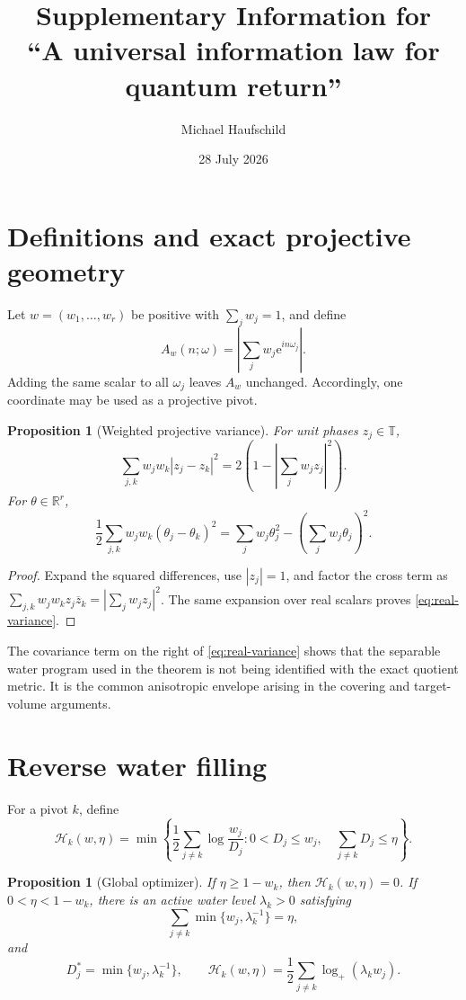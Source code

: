 \documentclass[10pt]{article}
\title{\textbf{Supplementary Information for\\
``A universal information law for quantum return''}}
\author{Michael Haufschild}
\date{28 July 2026}
\newtheorem{proposition}[theorem]{Proposition}
\theoremstyle{definition}
\newcommand{\R}{\mathbb R}
\newcommand{\T}{\mathbb T}
\newcommand{\Hwater}{\mathcal H}
\newcommand{\ee}{\mathrm e}
\begin{document}
\maketitle

\section{Definitions and exact projective geometry}

Let \(w=(w_1,\ldots,w_r)\) be positive with \(\sum_jw_j=1\), and define
\[
 A_w(n;\omega)=\left|\sum_jw_j\ee^{in\omega_j}\right|.
\]
Adding the same scalar to all \(\omega_j\) leaves \(A_w\) unchanged.
Accordingly, one coordinate may be used as a projective pivot.

\begin{proposition}[Weighted projective variance]
\label{prop:variance}
For unit phases \(z_j\in\T\),
\begin{equation}
 \sum_{j,k}w_jw_k|z_j-z_k|^2
 =2\left(1-\left|\sum_jw_jz_j\right|^2\right).
\label{eq:variance}
\end{equation}
For \(\theta\in\R^r\),
\begin{equation}
 \frac12\sum_{j,k}w_jw_k(\theta_j-\theta_k)^2
 =\sum_jw_j\theta_j^2-\left(\sum_jw_j\theta_j\right)^2.
\label{eq:real-variance}
\end{equation}
\end{proposition}

\begin{proof}
Expand the squared differences, use \(|z_j|=1\), and factor the cross
term as
\(\sum_{j,k}w_jw_kz_j\overline z_k=|\sum_jw_jz_j|^2\).
The same expansion over real scalars proves \eqref{eq:real-variance}.
\end{proof}

The covariance term on the right of \eqref{eq:real-variance} shows that the
separable water program used in the theorem is not being identified with the
exact quotient metric.  It is the common anisotropic envelope arising in the
covering and target-volume arguments.

\section{Reverse water filling}

For a pivot \(k\), define
\[
 \Hwater_k(w,\eta)
 =\min\left\{\frac12\sum_{j\ne k}\log\frac{w_j}{D_j}:
   0<D_j\leq w_j,\quad\sum_{j\ne k}D_j\leq\eta\right\}.
\]

\begin{proposition}[Global optimizer]
\label{prop:optimizer}
If \(\eta\geq1-w_k\), then \(\Hwater_k(w,\eta)=0\).  If
\(0<\eta<1-w_k\), there is an active water level
\(\lambda_k>0\) satisfying
\[
 \sum_{j\ne k}\min\{w_j,\lambda_k^{-1}\}=\eta,
\]
and
\[
 D_j^*=\min\{w_j,\lambda_k^{-1}\},\qquad
 \Hwater_k(w,\eta)=\frac12\sum_{j\ne k}\log_+(\lambda_kw_j).
\]
\end{proposition}
\end{document}
